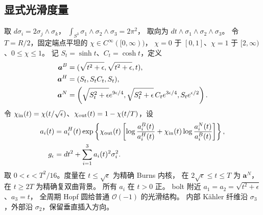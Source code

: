 \documentclass[UTF8,11pt,a4paper,fontset=none]{ctexart}
\numberwithin{equation}{section}
\theoremstyle{definition}
\theoremstyle{remark}\newtheorem{remark}[theorem]{说明}
\begin{document}
\subsection{显式光滑度量}
取 $d\sigma_i=2\sigma_j\wedge\sigma_k$，
$\int_{S^3}\sigma_1\wedge\sigma_2\wedge\sigma_3=2\pi^2$，
取向为 $dt\wedge\sigma_1\wedge\sigma_2\wedge\sigma_3$。
令 $T=R/2$，固定端点平坦的 $\chi\in C^\infty([0,\infty))$，
$\chi=0$ 于 $[0,1]$、$\chi=1$ 于 $[2,\infty)$、$0\le\chi\le1$。
记 $S_t=\sinh t$、$C_t=\cosh t$，定义
\begin{align}
\bm a^B&=(\sqrt{t^2+\epsilon},\sqrt{t^2+\epsilon},t),\notag\\
\bm a^H&=(S_t,S_tC_t,S_t),\label{eq:profiles}\\
\bm a^N&=\left(\sqrt{S_t^2+\epsilon}e^{9\epsilon/4},
\sqrt{S_t^2+\epsilon}\,C_t e^{3\epsilon/4},S_t e^{\epsilon/2}\right).\notag
\end{align}
令 $\chi_{\rm in}(t)=\chi(t/\sqrt\epsilon)$、$\chi_{\rm out}(t)=1-\chi(t/T)$，设
\begin{equation}\label{eq:metric}
\begin{split}
a_i(t)&=a_i^H(t)\exp\left\{\chi_{\rm out}(t)
\left[\log\frac{a_i^B(t)}{a_i^H(t)}+
\chi_{\rm in}(t)\log\frac{a_i^N(t)}{a_i^B(t)}\right]\right\},\\
g_\epsilon&=dt^2+\sum_{i=1}^3a_i(t)^2\sigma_i^2.
\end{split}
\end{equation}
取 $0<\epsilon<T^2/16$。度量在 $t\le\sqrt\epsilon$ 为精确 Burns 内核，
在 $2\sqrt\epsilon\le t\le T$ 为 $\bm a^N$，在 $t\ge2T$ 为精确复双曲背景。
所有 $a_i$ 在 $t>0$ 正。
bolt 附近 $a_1=a_2=\sqrt{t^2+\epsilon}$、$a_3=t$，
全周期 Hopf 圆给普通 $\mathcal O(-1)$ 的光滑结构。
内部 Kähler 纤维沿 $\sigma_3$，外部沿 $\sigma_2$，保留垂直插入方向。
\end{document}
